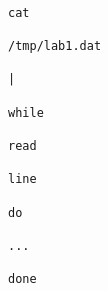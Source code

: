 \documentclass{exam}
\begin{document}
\begin{itemize}
\begin{lstlisting}
                                                                                                                                                                        cat
                                                                                                                                                                        /tmp/lab1.dat
                                                                                                                                                                        |
                                                                                                                                                                        while
                                                                                                                                                                        read
                                                                                                                                                                        line
                                                                                                                                                                            do
                                                                                                                                                                                ...
                                                                                                                                                                                    done
                                                                                                                                                                                        \end{lstlisting}
                                                                                                                                                                                             

\end{itemize}
\end{document}
